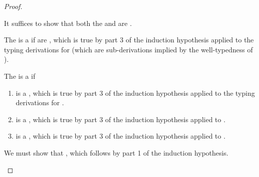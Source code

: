 \begin{proof}
\begin{proofcases}
      It suffices to show that both the  and  are
      .

      The 
      \im{\tdnpaire{\txi\dots}{\tnsigmaty{(\txi:\cctrans{\sAi}\dots)}}} is a
       if \im{\cctrans{\sAi}\dots} are
      , which is true by part 3 of the
      induction hypothesis applied to the typing derivations for \im{\sAi
        \dots} (which are sub-derivations implied by the well-typedness of
      \im{\se}).

      The  is a  if
      \begin{enumerate}
        \item \im{\tnsigmaty{(\txi:\cctrans{\sAi}\dots)}} is a , which is true by part 3 of the induction hypothesis applied to the typing derivations for \im{\sAi \dots}.
        \item \im{\tlete{\tnpaire{\txi\dots}}{\tn}{\cctrans{\sA}}} is a
          , which is true by part 3 of the induction
          hypothesis applied to \im{\sA}.
        \item \im{\tlete{\tnpaire{\txi\dots}}{\tn}{\cctrans{\se}}} is a
          , which is true by part 3 of the induction
          hypothesis applied to \im{\cctrans{\se}}.
      \end{enumerate}
    \item \im{\se = \sappe{\sV}{\sVpr}}
      We must show that \im{\te = \tappe{\tV}{\tVpr}}, which follows by part 1
      of the induction hypothesis.
  \end{proofcases}
\end{proof}
